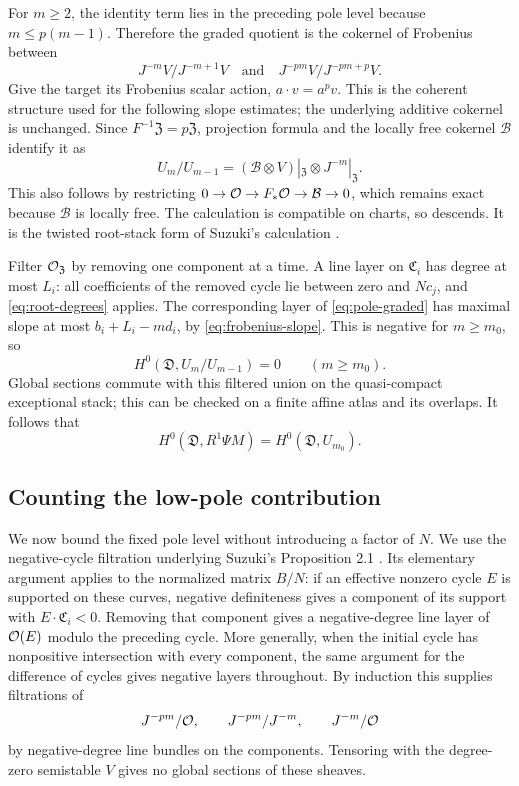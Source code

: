 For $m\geq2$, the identity term lies in the preceding pole level because $m\leq p(m-1)$. Therefore the graded quotient is the cokernel of Frobenius between
\[
 J^{-m}V/J^{-m+1}V
       \quad\text{and}\quad J^{-pm}V/J^{-pm+p}V.
\]
Give the target its Frobenius scalar action, $a\cdot v=a^pv$. This is the coherent structure used for the following slope estimates; the underlying additive cokernel is unchanged. Since $F^{-1}\mathfrak Z=p\mathfrak Z$, projection formula and the locally free cokernel $\mathcal B$ identify it as
\begin{equation}\label{eq:pole-graded}
 U_m/U_{m-1}=
 (\mathcal B\otimes V)|_{\mathfrak Z}\otimes J^{-m}|_{\mathfrak Z}.
\end{equation}
This also follows by restricting $0\to\mathcal O\to F_*\mathcal O\to\mathcal B\to0$, which remains exact because $\mathcal B$ is locally free. The calculation is compatible on charts, so descends. It is the twisted root-stack form of Suzuki's calculation \cite[Proposition 3.1, author pp.~6--7]{Suzuki}.

Filter $\mathcal O_{\mathfrak Z}$ by removing one component at a time. A line layer on $\mathfrak C_i$ has degree at most $L_i$: all coefficients of the removed cycle lie between zero and $Nc_j$, and \eqref{eq:root-degrees} applies. The corresponding layer of \eqref{eq:pole-graded} has maximal slope at most $b_i+L_i-md_i$, by \eqref{eq:frobenius-slope}. This is negative for $m\geq m_0$, so
\[
 H^0(\mathfrak D,U_m/U_{m-1})=0\qquad(m\geq m_0).
\]
Global sections commute with this filtered union on the quasi-compact exceptional stack; this can be checked on a finite affine atlas and its overlaps. It follows that
\begin{equation}\label{eq:cutoff}
 H^0(\mathfrak D,R^1\Psi M)=H^0(\mathfrak D,U_{m_0}).
\end{equation}

\subsection{Counting the low-pole contribution}

We now bound the fixed pole level without introducing a factor of $N$. We use the negative-cycle filtration underlying Suzuki's Proposition 2.1 \cite[author pp.~4--5]{Suzuki}. Its elementary argument applies to the normalized matrix $B/N$: if an effective nonzero cycle $E$ is supported on these curves, negative definiteness gives a component of its support with $E\cdot\mathfrak C_i<0$. Removing that component gives a negative-degree line layer of $\mathcal O(E)$ modulo the preceding cycle. More generally, when the initial cycle has nonpositive intersection with every component, the same argument for the difference of cycles gives negative layers throughout. By induction this supplies filtrations of
\[
 J^{-pm}/\mathcal O,\qquad J^{-pm}/J^{-m},\qquad J^{-m}/\mathcal O
\]
by negative-degree line bundles on the components. Tensoring with the degree-zero semistable $V$ gives no global sections of these sheaves.

